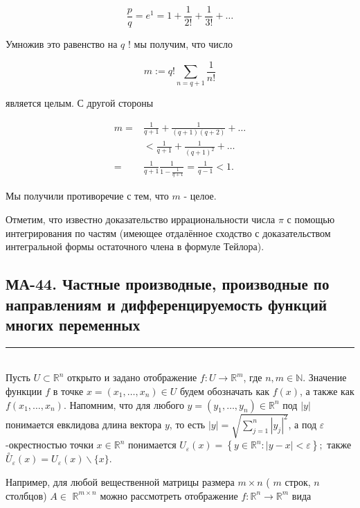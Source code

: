 \documentclass[a4paper,12pt]{article} %
\newcommand{\HRule}{\rule{\linewidth}{0.5mm}}
\begin{document}
$$
\frac{p}{q}=e^{1}=1+\frac{1}{2 !}+\frac{1}{3 !}+\ldots
$$

Умножив это равенство на $q$ ! мы получим, что число

$$
m:=q ! \sum_{n=q+1} \frac{1}{n !}
$$

является целым. С другой стороны

$$
\begin{aligned}
m= & \frac{1}{q+1}+\frac{1}{(q+1)(q+2)}+\ldots \\
& <\frac{1}{q+1}+\frac{1}{(q+1)^{2}}+\ldots \\
= & \frac{1}{q+1} \frac{1}{1-\frac{1}{q+1}}=\frac{1}{q-1}<1 .
\end{aligned}
$$

Мы получили противоречие с тем, что $m$ - целое.

Отметим, что известно доказательство иррациональности числа $\pi$ с помощью интегрирования по частям (имеющее отдалённое сходство с доказательством интегральной формы остаточного члена в формуле Тейлора).


\newpage
\begin{LARGE}
\begin{center}
	\section{МА-44. Частные производные, производные по направлениям и дифференцируемость функций многих переменных }
\end{center}
\end{LARGE}
\HRule \\

Пусть $U \subset \mathbb{R}^{n}$ открыто и задано отображение $f: U \rightarrow \mathbb{R}^{m}$, где $n, m \in \mathbb{N}$. Значение функции $f$ в точке $x=\left(x_{1}, \ldots, x_{n}\right) \in U$ будем обозначать как $f(x)$, а также как $f\left(x_{1}, \ldots, x_{n}\right)$. Напомним, что для любого $y=\left(y_{1}, \ldots, y_{n}\right) \in \mathbb{R}^{n}$ под $|y|$ понимается евклидова длина вектора $y$, то есть $|y|=\sqrt{\sum_{j=1}^{n}\left|y_{j}\right|^{2}}$, а под $\varepsilon$-окрестностью точки $x \in \mathbb{R}^{n}$ понимается $U_{\varepsilon}(x)=\left\{y \in \mathbb{R}^{n}:|y-x|<\varepsilon\right\} ;$ также $\stackrel{\circ}{U}_{\varepsilon}(x)=U_{\varepsilon}(x) \backslash\{x\}$.

Например, для любой вещественной матрицы размера $m \times n$ ( $m$ строк, $n$ столбцов) $A \in$ $\mathbb{R}^{m \times n}$ можно рассмотреть отображение $f: \mathbb{R}^{n} \rightarrow \mathbb{R}^{m}$ вида
\end{document}

